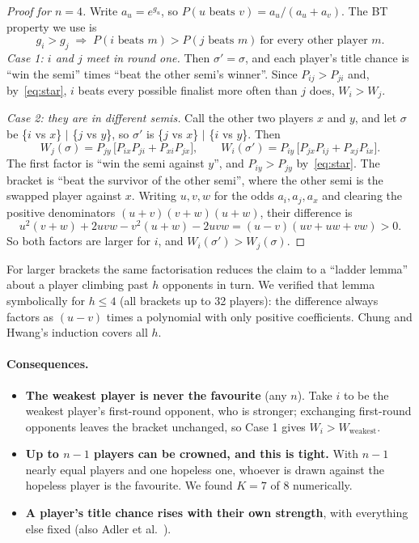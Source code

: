 \documentclass[11pt]{article}
\theoremstyle{remark}
\begin{document}
\begin{proof}[Proof for $n=4$]
Write $a_u=e^{g_u}$, so $P(u\text{ beats }v)=a_u/(a_u+a_v)$. The BT property we use is
\begin{equation}
\label{eq:star}
g_i>g_j \;\Rightarrow\; P(i\text{ beats }m) > P(j\text{ beats }m)\ \text{for every other player } m. \tag{$\star$}
\end{equation}
\emph{Case 1: $i$ and $j$ meet in round one.} Then $\sigma'=\sigma$, and each player's title chance is ``win the semi''
times ``beat the other semi's winner''. Since $P_{ij}>P_{ji}$ and, by~\eqref{eq:star}, $i$ beats every possible finalist more
often than $j$ does, $W_i>W_j$.

\emph{Case 2: they are in different semis.} Call the other two players $x$ and $y$, and let $\sigma$ be
\{$i$ vs $x$\} $|$ \{$j$ vs $y$\}, so $\sigma'$ is \{$j$ vs $x$\} $|$ \{$i$ vs $y$\}. Then
\[
W_j(\sigma) = P_{jy}\,\big[P_{ix}P_{ji}+P_{xi}P_{jx}\big],\qquad W_i(\sigma') = P_{iy}\,\big[P_{jx}P_{ij}+P_{xj}P_{ix}\big].
\]
The first factor is ``win the semi against $y$'', and $P_{iy}>P_{jy}$ by~\eqref{eq:star}. The bracket is ``beat the survivor
of the other semi'', where the other semi is the swapped player against $x$. Writing $u,v,w$ for the odds $a_i,a_j,a_x$ and clearing the
positive denominators $(u+v)(v+w)(u+w)$, their difference is
\[
u^2(v+w)+2uvw - v^2(u+w) - 2uvw = (u-v)(uv+uw+vw) > 0 .
\]
So both factors are larger for $i$, and $W_i(\sigma')>W_j(\sigma)$.
\end{proof}
For larger brackets the same factorisation reduces the claim to a ``ladder lemma'' about a player climbing past $h$
opponents in turn. We verified that lemma symbolically for $h\le4$ (all brackets up to 32 players): the difference
always factors as $(u-v)$ times a polynomial with only positive coefficients. Chung and Hwang's induction covers all $h$.

\paragraph{Consequences.}
\begin{itemize}
\item \textbf{The weakest player is never the favourite} (any $n$). Take $i$ to be the weakest player's first-round opponent,
who is stronger; exchanging first-round opponents leaves the bracket unchanged, so Case 1 gives $W_i>W_{\text{weakest}}$.
\item \textbf{Up to $n-1$ players can be crowned, and this is tight.} With $n-1$ nearly equal players and one hopeless one,
whoever is drawn against the hopeless player is the favourite. We found $K=7$ of 8 numerically.
\item \textbf{A player's title chance rises with their own strength}, with everything else fixed (also Adler et
al.~\cite{adler2017random}).
\end{itemize}
\end{document}
